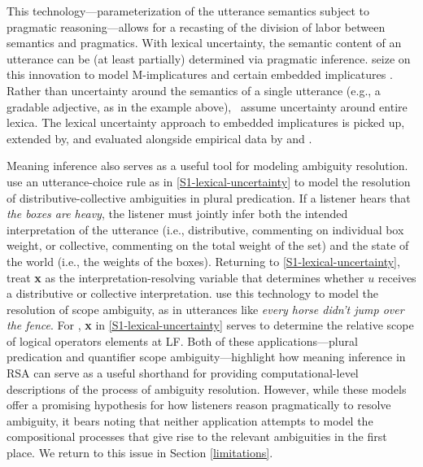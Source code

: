 \documentclass{sp}
\begin{document}
This technology---parameterization of the utterance semantics subject to pragmatic reasoning---allows for a recasting of the division of labor between semantics and pragmatics. With lexical uncertainty, the semantic content of an utterance can be (at least partially) determined via pragmatic inference. \cite{bergenetal2016} seize on this innovation to model M-implicatures \citep{horn1984} and certain embedded implicatures \citep{hurford1974,chierchiaetal2012}. Rather than uncertainty around the semantics of a single utterance (e.g., a gradable adjective, as in the example above), \citeauthor{bergenetal2016}~assume uncertainty around entire lexica.
The lexical uncertainty approach to embedded implicatures is picked up, extended by, and evaluated alongside empirical data by \cite{PottsLassiter2016:Embedded-implic} and \cite{FrankeBergen2020:Theory-driven-s}.

Meaning inference also serves as a useful tool for modeling ambiguity resolution. \cite{scontrasgoodman2017} use an utterance-choice rule as in \eqref{S1-lexical-uncertainty} to model the resolution of distributive-collective ambiguities in plural predication. If a listener hears that \emph{the boxes are heavy}, the listener must jointly infer both the intended interpretation of the utterance (i.e., distributive, commenting on individual box weight, or collective, commenting on the total weight of the set) and the state of the world (i.e., the weights of the boxes). Returning to \eqref{S1-lexical-uncertainty}, \citeauthor{scontrasgoodman2017} treat \textbf{x} as the interpretation-resolving variable that determines whether $u$ receives a distributive or collective interpretation. \cite{savinellietal2017,savinellietal2018} use this technology to model the resolution of scope ambiguity, as in utterances like \emph{every horse didn't jump over the fence}. For \citeauthor{savinellietal2017}, \textbf{x} in \eqref{S1-lexical-uncertainty} serves to determine the relative scope of logical operators elements at LF. 
Both of these applications---plural predication and quantifier scope ambiguity---highlight how meaning inference in RSA can serve as a useful shorthand for providing computational-level descriptions of the process of ambiguity resolution. However, while these models offer a promising hypothesis for how listeners reason pragmatically to resolve ambiguity, it bears noting that neither application attempts to model the compositional processes that give rise to the relevant ambiguities in the first place. We return to this issue in Section \ref{limitations}.
\end{document}
